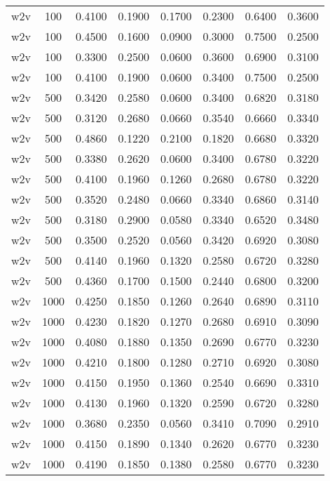 \begin{scriptsize}
\begin{longtable}{cccccccc}
		w2v      & 100  & 0.4100 & 0.1900 & 0.1700 & 0.2300 & 0.6400 & 0.3600 \\
		w2v      & 100  & 0.4500 & 0.1600 & 0.0900 & 0.3000 & 0.7500 & 0.2500 \\
		w2v      & 100  & 0.3300 & 0.2500 & 0.0600 & 0.3600 & 0.6900 & 0.3100 \\
		w2v      & 100  & 0.4100 & 0.1900 & 0.0600 & 0.3400 & 0.7500 & 0.2500 \\
		w2v      & 500  & 0.3420 & 0.2580 & 0.0600 & 0.3400 & 0.6820 & 0.3180 \\
		w2v      & 500  & 0.3120 & 0.2680 & 0.0660 & 0.3540 & 0.6660 & 0.3340 \\
		w2v      & 500  & 0.4860 & 0.1220 & 0.2100 & 0.1820 & 0.6680 & 0.3320 \\
		w2v      & 500  & 0.3380 & 0.2620 & 0.0600 & 0.3400 & 0.6780 & 0.3220 \\
		w2v      & 500  & 0.4100 & 0.1960 & 0.1260 & 0.2680 & 0.6780 & 0.3220 \\
		w2v      & 500  & 0.3520 & 0.2480 & 0.0660 & 0.3340 & 0.6860 & 0.3140 \\
		w2v      & 500  & 0.3180 & 0.2900 & 0.0580 & 0.3340 & 0.6520 & 0.3480 \\
		w2v      & 500  & 0.3500 & 0.2520 & 0.0560 & 0.3420 & 0.6920 & 0.3080 \\
		w2v      & 500  & 0.4140 & 0.1960 & 0.1320 & 0.2580 & 0.6720 & 0.3280 \\
		w2v      & 500  & 0.4360 & 0.1700 & 0.1500 & 0.2440 & 0.6800 & 0.3200 \\
		w2v      & 1000 & 0.4250 & 0.1850 & 0.1260 & 0.2640 & 0.6890 & 0.3110 \\
		w2v      & 1000 & 0.4230 & 0.1820 & 0.1270 & 0.2680 & 0.6910 & 0.3090 \\
		w2v      & 1000 & 0.4080 & 0.1880 & 0.1350 & 0.2690 & 0.6770 & 0.3230 \\
		w2v      & 1000 & 0.4210 & 0.1800 & 0.1280 & 0.2710 & 0.6920 & 0.3080 \\
		w2v      & 1000 & 0.4150 & 0.1950 & 0.1360 & 0.2540 & 0.6690 & 0.3310 \\
		w2v      & 1000 & 0.4130 & 0.1960 & 0.1320 & 0.2590 & 0.6720 & 0.3280 \\
		w2v      & 1000 & 0.3680 & 0.2350 & 0.0560 & 0.3410 & 0.7090 & 0.2910 \\
		w2v      & 1000 & 0.4150 & 0.1890 & 0.1340 & 0.2620 & 0.6770 & 0.3230 \\
		w2v      & 1000 & 0.4190 & 0.1850 & 0.1380 & 0.2580 & 0.6770 & 0.3230 \\

\end{longtable}
\end{scriptsize}
